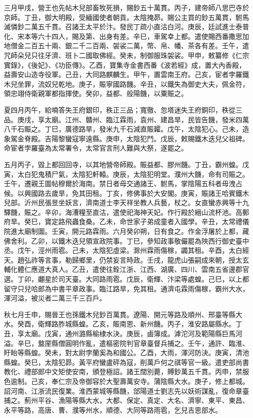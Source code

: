 \begin{pinyinscope}
 三月甲戌，營王也先帖木兒部畜牧死損，賜鈔五十萬貫。丙子，建帝師八思巴寺於京師。丁丑，御大明殿，受緬國使者朝貢。太陰掩昴。賜公主買的鈔五萬貫，駙馬滅憐鈔二萬五千貫。召諸王太平於汴。發民丁疏小直沽白河。庚辰，廷試進士泰普化、宋本等六十四人，賜及第、出身有差。辛巳，車駕幸上都。遣使賜西番撒思加地僧金二百五十兩、銀二千二百兩、袈裟二萬，幣、帛、幡、茶各有差。壬午，遣咒師朵兒只往牙濟、班卜二國取佛經。癸未，制御服珠袈裟。甲申，敕纂修《仁宗實錄》，《後妃》、《功臣傳》。乙酉，寶集寺金書西番《波若經》成，置大內香殿，益壽安山造寺役軍。己丑，大同路麒麟生。甲午，置雲南王府。己亥，宦者孛羅鐵木兒坐罪，流奴兒乾地。庚子，賑寧國路饑。辛丑，以鐵失為御史大夫，佩金符，領忠翊侍衛親軍都指揮使。癸卯，益都、般陽饑，以粟賑之。



 夏四月丙午，給喃答失王府銀印，秩正三品；寬徹、忽塔迷失王府銅印，秩從三品。庚戌，享太廟。江州、贛州、臨江霖雨，袁州、建昌旱，民皆告饑，發米四萬八千石賑之。丁巳，廣德路旱，發米九千石減直賑糶。戊午，太陰犯心。己未，造象駕金脊殿。吉陽黎蠻寇寧遠縣。庚申，太陰犯鬥。戊辰，敕賜鐵木迭兒父祖碑。命宦者孛羅臺為太常署令，太常官言刑人難與大祭，遂罷之。



 五月丙子，毀上都回回寺，以其地營帝師殿。賑益都、膠州饑。丁丑，霸州蝗。戊寅，太白犯鬼積尸氣，太陰犯軒轅。庚辰，太陰犯明堂。濮州大饑，命有司賑之。壬午，遷親王圖帖穆爾於海南。禁日者毋交通諸王、駙馬，掌陰陽五科者毋洩占候。以興國路去歲旱，免其田租。丁亥，修佛事於大安閣。庚寅，賑諸王哈賓鐵木兒部。沂州民張昱坐妖言，濟南道士李天祥坐教人兵藝，杖之。女直蠻赤興等十九驛饑，賑之。辛卯，海漕糧至直沽，遣使祀海神天妃。作行殿於縉山流杯池。高郵府旱。癸巳，寶定路飛蟲食桑。乙未，命世家子弟成童者入國學。辛丑，太常禮儀院進太廟制圖。壬寅，開元路霖雨。六月癸卯朔，日有食之。作金浮屠於上都，藏佛舍利。乙卯，以鐵木迭兒領宣政院事。丁巳，參知政事敬儼罷為陜西行御史臺中丞。戊午，涇州雨雹。己未，太陰犯虛梁。滁州霖雨傷稼，蠲其租。辛酉，太白經天。趙弘祚等言事，勒歸鄉里，仍禁妄言時政。壬戌，龍虎山張嗣成來朝，授太玄輔化體仁應道大真人。乙丑，遣使往銓江浙、江西、湖廣、四川、雲南五省邊郡官選。丁卯，翽星於司天臺。大同路雨雹。戊辰，衛輝、汴梁等處蝗。己巳，以上都留守只兒哈郎為中書平章政事。臨江路旱，免其租。通濟屯霖雨傷稼，霸州大水，渾河溢，被災者二萬三千三百戶。



 秋七月壬申，賜晉王也孫鐵木兒鈔百萬貫。遼陽、開元等路及順州、邢臺等縣大水。癸酉，衛輝路胙城縣蝗。乙亥，賑南恩、新州饑。丙子，淮安路屬縣水。丁丑，享太廟。戊寅，通州潞縣榆棣水決。庚辰，鹵簿成。滹沱河及範陽縣巨馬河溢。辛巳，盩厔縣僧圓明作亂，遣樞密院判官章臺督兵捕之。壬午，通許、臨淮、盱眙等縣蝗。癸未，對太尉孛蘭奚為和國公。乙酉，大雨，渾河防決。庚寅，清池縣蝗。癸巳，太陰犯昴。黃平府蠻盧砰為寇，削萬戶何之祺等官一級。遣吏部尚書教化、禮部郎中文矩使安南，頒登極詔。諸王闊別薨，賻鈔萬五千貫。丙申，禁服色逾制。己亥，奉仁宗及帝御容於大聖壽萬安寺。蒲陰縣大水。庚子，修上都城。詔河南、江浙流民復業。淮西蒙城等縣饑，郃陽道士劉志先以妖術謀亂，復命章臺捕之。薊州平谷、漁陽等縣大水，大都、保定、真定、大名、濟寧、東平、東昌、永平等路，高唐、曹、濮等州水，順德、大同等路雨雹，乞兒吉思部水。




\end{pinyinscope}
